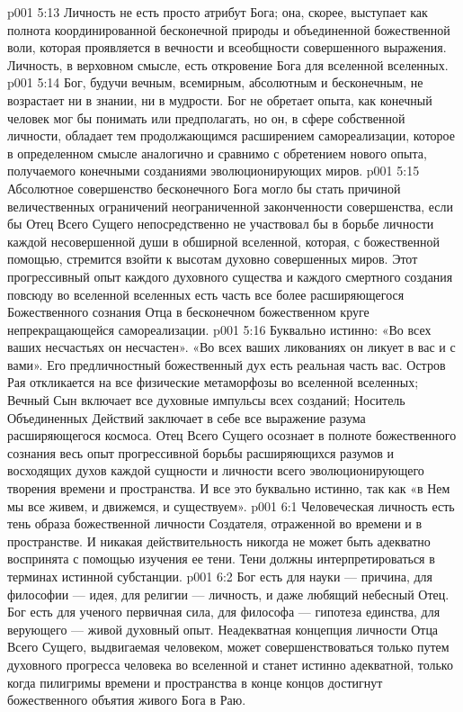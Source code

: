 \vs p001 5:13 \pc Личность не есть просто атрибут Бога; она, скорее, выступает как полнота координированной бесконечной природы и объединенной божественной воли, которая проявляется в вечности и всеобщности совершенного выражения. Личность, в верховном смысле, есть откровение Бога для вселенной вселенных.
\vs p001 5:14 \pc Бог, будучи вечным, всемирным, абсолютным и бесконечным, не возрастает ни в знании, ни в мудрости. Бог не обретает опыта, как конечный человек мог бы понимать или предполагать, но он, в сфере собственной личности, обладает тем продолжающимся расширением самореализации, которое в определенном смысле аналогично и сравнимо с обретением нового опыта, получаемого конечными созданиями эволюционирующих миров.
\vs p001 5:15 Абсолютное совершенство бесконечного Бога могло бы стать причиной величественных ограничений неограниченной законченности совершенства, если бы Отец Всего Сущего непосредственно не участвовал бы в борьбе личности каждой несовершенной души в обширной вселенной, которая, с божественной помощью, стремится взойти к высотам духовно совершенных миров. Этот прогрессивный опыт каждого духовного существа и каждого смертного создания повсюду во вселенной вселенных есть часть все более расширяющегося Божественного сознания Отца в бесконечном божественном круге непрекращающейся самореализации.
\vs p001 5:16 Буквально истинно: «Во всех ваших несчастьях он несчастен». «Во всех ваших ликованиях он ликует в вас и с вами». Его предличностный божественный дух есть реальная часть вас. Остров Рая откликается на все физические метаморфозы во вселенной вселенных; Вечный Сын включает все духовные импульсы всех созданий; Носитель Объединенных Действий заключает в себе все выражение разума расширяющегося космоса. Отец Всего Сущего осознает в полноте божественного сознания весь опыт прогрессивной борьбы расширяющихся разумов и восходящих духов каждой сущности и личности всего эволюционирующего творения времени и пространства. И все это буквально истинно, так как «в Нем мы все живем, и движемся, и существуем».
\vs p001 6:1 Человеческая личность есть тень образа божественной личности Создателя, отраженной во времени и в пространстве. И никакая действительность никогда не может быть адекватно воспринята с помощью изучения ее тени. Тени должны интерпретироваться в терминах истинной субстанции.
\vs p001 6:2 \pc Бог есть для науки --- причина, для философии --- идея, для религии --- личность, и даже любящий небесный Отец. Бог есть для ученого первичная сила, для философа --- гипотеза единства, для верующего --- живой духовный опыт. Неадекватная концепция личности Отца Всего Сущего, выдвигаемая человеком, может совершенствоваться только путем духовного прогресса человека во вселенной и станет истинно адекватной, только когда пилигримы времени и пространства в конце концов достигнут божественного объятия живого Бога в Раю.
